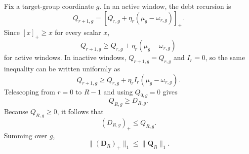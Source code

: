 \documentclass[letterpaper,journal]{IEEEtran}
\begin{document}
Fix a target-group coordinate $g$.  In an active window, the debt recursion is
\begin{equation}
    Q_{r+1,g}
    =
    \left[
    Q_{r,g}
    +
    \eta_r
    \left(
    \mu_g-\omega_{r,g}
    \right)
    \right]_+.
    \label{eq:app_debt_coordinate}
\end{equation}
Since $[x]_+\ge x$ for every scalar $x$,
\begin{equation}
    Q_{r+1,g}
    \ge
    Q_{r,g}
    +
    \eta_r
    \left(
    \mu_g-\omega_{r,g}
    \right)
    \label{eq:app_debt_one_step}
\end{equation}
for active windows.  In inactive windows,
$Q_{r+1,g}=Q_{r,g}$ and $I_r=0$, so the same inequality can be written
uniformly as
\begin{equation}
    Q_{r+1,g}
    \ge
    Q_{r,g}
    +
    \eta_rI_r
    \left(
    \mu_g-\omega_{r,g}
    \right).
    \label{eq:app_debt_one_step_all}
\end{equation}
Telescoping from $r=0$ to $R-1$ and using $Q_{0,g}=0$ gives
\begin{equation}
    Q_{R,g}
    \ge
    D_{R,g}.
    \label{eq:app_Q_dominates_D}
\end{equation}
Because $Q_{R,g}\ge0$, it follows that
\begin{equation}
    (D_{R,g})_+
    \le
    Q_{R,g}.
    \label{eq:app_positive_part_domination}
\end{equation}
Summing over $g$,
\begin{equation}
    \|(\mathbf{D}_R)_+\|_1
    \le
    \|\mathbf{Q}_R\|_1.
    \label{eq:app_positive_part_l1}
\end{equation}
\end{document}
